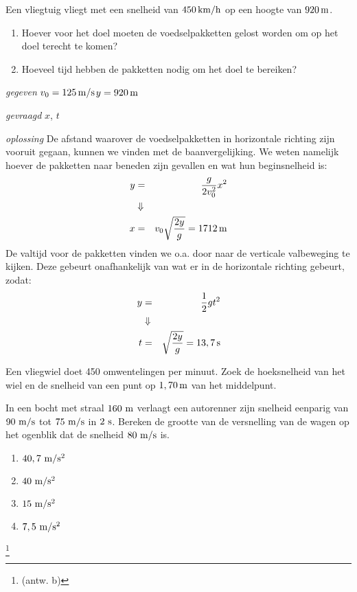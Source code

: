 \documentclass{ximera}
\begin{document}
\begin{exercise}[Opgave] Een vliegtuig vliegt met een snelheid van $450\rm\,km/h$ op een hoogte van $920\rm\,m$.
\begin{enumerate}
\item Hoever voor het doel moeten de voedselpakketten gelost worden om op het doel terecht te komen?
\item Hoeveel tijd hebben de pakketten nodig om het doel te bereiken?
\end{enumerate}
\begin{oplossing}
\item[\textit{gegeven}]$v_0=125\rm\,m/s$\newline$y=920\rm\,m$
\item[\textit{gevraagd}]$x$, $t$
\item[\textit{oplossing}]De afstand waarover de voedselpakketten in
horizontale richting zijn vooruit gegaan, kunnen we vinden met de
baanvergelijking. We weten namelijk hoever de pakketten naar beneden
zijn gevallen en wat hun beginsnelheid is:
\begin{eqnarray*}
y&=&\frac{g}{2v_0^2}x^2\\
&\Downarrow&\\
x&=&v_0\sqrt{\frac{2y}{g}}=1712\rm\,m
\end{eqnarray*}
De valtijd voor de pakketten vinden we o.a. door naar de verticale
valbeweging te kijken. Deze gebeurt onafhankelijk van wat er in de
horizontale richting gebeurt, zodat:
\begin{eqnarray*}
y&=&\frac{1}{2}gt^2\\
&\Downarrow&\\
t&=&\sqrt{\frac{2y}{g}}=13,7\rm\,s
\end{eqnarray*}
\end{oplossing}









\end{exercise}

\begin{exercise} Een vliegwiel doet 450 omwentelingen per minuut. Zoek de hoeksnelheid van het wiel en de snelheid van een punt op $1,70\rm\,m$ van het middelpunt.

\end{exercise}

\begin{exercise} In een bocht met straal $160~\rm m$ verlaagt een autorenner
zijn snelheid eenparig van $90~\rm m/s$ tot $75~\rm m/s$ in $2~\rm
s$. Bereken de grootte van de versnelling van de wagen op het
ogenblik dat de snelheid $80~\rm m/s$ is.
\begin{enumerate}
\item $40,7~\rm m/s^2$
\item $40~\rm m/s^2$
\item $15~\rm m/s^2$
\item $7,5~\rm m/s^2$
\end{enumerate}
\footnote{(antw. b)}

\end{exercise}
\end{document}
